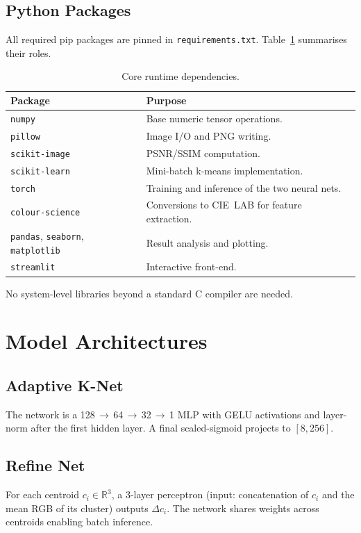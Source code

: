 \documentclass[11pt]{article}
\begin{document}
\subsection{Python Packages}
All required pip packages are pinned in \texttt{requirements.txt}. Table~\ref{tab:packages} summarises their roles.

\begin{table}[H]
\centering
\begin{tabular}{lp{7cm}}
\textbf{Package} & \textbf{Purpose}\\\hline
\texttt{numpy} & Base numeric tensor operations.\\
\texttt{pillow} & Image I/O and PNG writing.\\
\texttt{scikit-image} & PSNR/SSIM computation.\\
\texttt{scikit-learn} & Mini-batch k-means implementation.\\
\texttt{torch} & Training and inference of the two neural nets.\\
\texttt{colour-science} & Conversions to CIE~LAB for feature extraction.\\
\texttt{pandas}, \texttt{seaborn}, \texttt{matplotlib} & Result analysis and plotting.\\
\texttt{streamlit} & Interactive front-end.\\
\end{tabular}
\caption{Core runtime dependencies.}
\label{tab:packages}
\end{table}

No system-level libraries beyond a standard C compiler are needed.

\section{Model Architectures}
\subsection{Adaptive K-Net}
The network is a 128\,$\rightarrow$\,64\,$\rightarrow$\,32\,$\rightarrow$\,1 MLP with GELU activations and layer-norm after the first hidden layer. A final scaled-sigmoid projects to $[8,256]$.

\subsection{Refine Net}
For each centroid $c_i\in\mathbb{R}^3$, a 3-layer perceptron (input: concatenation of $c_i$ and the mean RGB of its cluster) outputs $\Delta c_i$. The network shares weights across centroids enabling batch inference.
\end{document}
